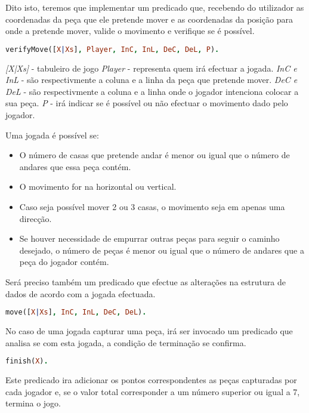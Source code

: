 \documentclass[a4paper]{article}
\begin{document}
Dito isto, teremos que implementar um predicado que, recebendo do utilizador as coordenadas da peça que ele pretende mover e as coordenadas da posição para onde a pretende mover, valide o movimento e verifique se é possível.
\bigskip
\begin{lstlisting}[language=Prolog]
verifyMove([X|Xs], Player, InC, InL, DeC, DeL, P).
\end{lstlisting}
\bigskip

\noindent 
\textit{[X|Xs]} - tabuleiro de jogo
\noindent
\textit{Player} - representa quem irá efectuar a jogada.
\newline
\textit{InC e InL} - são respectivmente a coluna e a linha da peça que pretende mover.
\newline
\textit{DeC e DeL} - são respectivmente a coluna e a linha onde o jogador intenciona colocar a sua peça.
\newline
\textit{P} - irá indicar se é possível ou não efectuar o movimento dado pelo jogador.
\bigskip

Uma jogada é possível se:
\begin{itemize}
	\item O número de casas que pretende andar é menor ou igual que o número de andares que essa peça contém.
	\item O movimento for na horizontal ou vertical.
	\item Caso seja possível mover 2 ou 3 casas, o movimento seja em apenas uma direcção.
	\item Se houver necessidade de empurrar outras peças para seguir o caminho desejado, o número de peças é menor ou igual que o número de andares que a peça do jogador contém.
	
\end{itemize}
\bigskip

Será preciso também um predicado que efectue as alterações na estrutura de dados de acordo com a jogada efectuada.
\bigskip
\begin{lstlisting}[language=Prolog]
move([X|Xs], InC, InL, DeC, DeL).
\end{lstlisting}
\bigskip

No caso de uma jogada capturar uma peça, irá ser invocado um predicado que analisa se com esta jogada, a condição de terminação se confirma.
\bigskip
\begin{lstlisting}[language=Prolog]
finish(X).
\end{lstlisting}
\bigskip
\newline
Este predicado ira adicionar os pontos correspondentes as peças capturadas por cada jogador e, se o valor total corresponder a um número superior ou igual a 7, termina o jogo.
\bigskip
\end{document}
